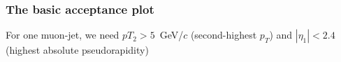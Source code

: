 \documentclass[compress]{beamer}
\begin{document}
\begin{frame}
\frametitle{The basic acceptance plot}

For one muon-jet, we need $pT_2 > 5$~GeV/$c$ (second-highest $p_T$)
and $|\eta_1| < 2.4$ (highest absolute pseudorapidity)


\end{frame}
\end{document}
